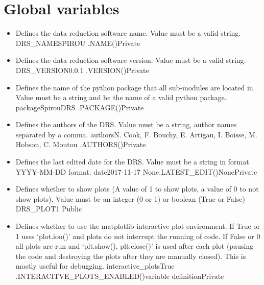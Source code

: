 \fi





\section{Global variables}
\label{ch:variables:global}


\begin{itemize}
\ifdevguide
\item {}
{Defines the data reduction software name. Value must be a valid string.}
{DRS\_NAME}{SPIROU}
{\AllRecipes}{\spirouCONST.NAME()}{\AllRecipes}{Private}
\fi

\ifdevguide
\item {}
{Defines the data reduction software version. Value must be a valid string.}
{DRS\_VERSION}{0.0.1}
{\AllRecipes}{\spirouCONST.VERSION()}{\AllRecipes}{Private}
\fi


\ifdevguide
\item {}
{Defines the name of the python package that all sub-modules are located in. Value must be a string and be the name of a valid python package.}
{package}{SpirouDRS}
{\AllRecipes}{\spirouCONST.PACKAGE()}{\AllRecipes}{Private}
\fi


\ifdevguide
\item {}
{Defines the authors of the DRS. Value must be a string, author names separated by a comma.}
{authors}{N. Cook, F. Bouchy, E. Artigau, I. Boisse, M. Hobson, C. Moutou}
{\AllRecipes}{\spirouCONST.AUTHORS()}{\AllRecipes}{Private}
\fi


\ifdevguide
\item {}
{Defines the last edited date for the DRS. Value must be a string in format YYYY-MM-DD format.}
{date}{2017-11-17}
{None}{\spirouCONST.LATEST\_EDIT()}{None}{Private}
\fi


\item {}
{Defines whether to show plots (A value of 1 to show plots, a value of 0 to not show plots). Value must be an integer (0 or 1) or boolean (True or False)}
{DRS\_PLOT}{1}
{\AllRecipes}{\configtxtfile}{\AllRecipes}{Public}



\ifdevguide
\item {}
{Defines whether to use the matplotlib interactive plot environment. If True or 1 uses `plot.ion()' and plots do not interrupt the running of code. If False or 0 all plots are run and `plt.show(), plt.close()' is used after each plot (pausing the code and destroying the plots after they are manually closed). This is mostly useful for debugging.}
{interactive\_plots}{True}
{\spirouPlot}{\spirouCONST.INTERACITVE\_PLOTS\_ENABLED()}{\spirouPlot variable definition}{Private}
\fi


\end{itemize}
